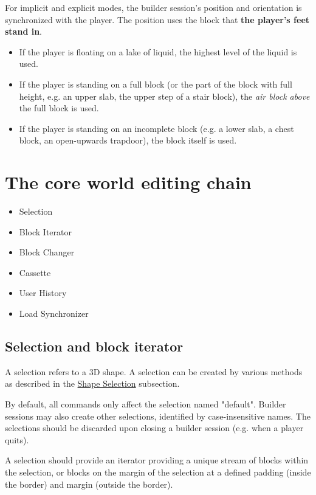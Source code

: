 \documentclass{report}
\begin{document}
			For implicit and explicit modes, the builder session's position and orientation is synchronized with the
			player. The position uses the block that \textbf{the player's feet stand in}.
			\begin{itemize}
				\item If the player is floating on a lake of liquid, the highest level of the liquid is used.
				\item If the player is standing on a full block (or the part of the block with full height, e.g. an
					upper slab, the upper step of a stair block), the \emph{air block above} the full block is used.
				\item If the player is standing on an incomplete block (e.g. a lower slab, a chest block, an
					open-upwards trapdoor), the block itself is used.
			\end{itemize}

		\section{The core world editing chain}
			\begin{itemize}
				\item Selection
				\item Block Iterator
				\item Block Changer
				\item Cassette
				\item User History
				\item Load Synchronizer
			\end{itemize}

			\subsection{Selection and block iterator}
				A selection refers to a 3D shape. A selection can be created by various methods as described in the
				\hyperref[sec:shape-selection]{Shape Selection} subsection.

				By default, all commands only affect the selection named "default". Builder sessions may also create
				other selections, identified by case-insensitive names. The selections should be discarded upon closing
				a builder session (e.g. when a player quits).

				A selection should provide an iterator providing a unique stream of blocks within the selection, or
				blocks on the margin of the selection at a defined padding (inside the border) and margin (outside the
				border).
\end{document}
